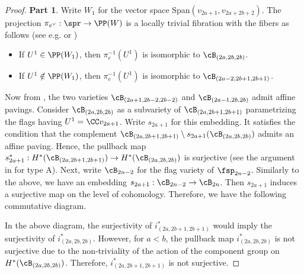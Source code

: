 \documentclass[12pt]{amsart}
\begin{document}
\begin{proof}
   \textbf{Part 1}. Write $W_1$ for the vector space Span$(v_{2a+1}, v_{2a+2b+2})$. The projection $\pi_{e^\vee}: \spr\rightarrow \PP(W)$ is a locally trivial fibration with the fibers as follows (see e.g. \cite[Section 2.1]{Shoji1983} or \cite[Section 5]{Kim2018})
   \begin{itemize}
       \item If $U^1\in \PP(W_1)$, then $\pi_{e}^{-1}(U^1)$ is isomorphic to $\cB_{(2a, 2b, 2b)}$.
       \item If $U^1\notin \PP(W_1)$, then $\pi_{e}^{-1}(U^1)$ is isomorphic to $\cB_{(2a-2, 2b+1, 2b+1)}$.
   \end{itemize}   
   Now from \cite[Theorem 3.9]{DLP}, the two varieties $\cB_{(2a+1, 2b-2, 2b-2)}$ and $\cB_{(2a-1, 2b, 2b)}$ admit affine pavings. Consider $\cB_{(2a, 2b, 2b)}$ as a subvariety of $\cB_{(2a,2b+1,2b+1)}$ parametrizing the flags having $U^1= \CC v_{2a+1}$. Write $s_{2a+1}$ for this embedding. It satisfies the condition that the complement $\cB_{(2a,2b+1,2b+1)}\setminus s_{2a+1}(\cB_{(2a, 2b, 2b)})$ admits an affine paving. Hence, the pullback map $s_{2a+1}^*: H^*(\cB_{(2a,2b+1,2b+1)})\rightarrow H^*(\cB_{(2a, 2b, 2b)})$ is surjective (see the argument in \cite{Hotta1977} for type A).
   Next, write $\cB_{2n-2}$ for the flag variety of $\fsp_{2n-2}$.  Similarly to the above, we have an embedding $s_{2a+1}: \cB_{2n-2}\rightarrow \cB_{2n}$. Then $s_{2a+1}$ induces a surjective map on the level of cohomology. Therefore, we have the following commutative diagram.
   \begin{center}
            \end{center}
    In the above diagram, the surjectivity of $i^{*}_{(2a,2b+1,2b+1)}$ would imply the surjectivity of $i^*_{(2a,2b,2b)}$. However, for $a< b$, the pullback map $i^*_{(2a,2b,2b)}$ is not surjective due to the non-triviality of the action of the component group on $H^*(\cB_{(2a,2b,2b)})$. Therefore, $i^{*}_{(2a,2b+1,2b+1)}$ is not surjective.


\end{proof}
\end{document}

